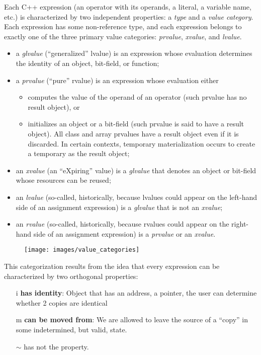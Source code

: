 Each C++ expression (an operator with its operands, a literal, a variable name, etc.) is characterized by two independent properties:
a \emph{type} and a \emph{value category}. Each expression has some non-reference type, and each expression belongs to exactly one of the three
primary value categories: \emph{prvalue}, \emph{xvalue}, and \emph{lvalue}.
\begin{itemize}
  \item a \emph{glvalue} (``generalized'' lvalue) is an expression whose evaluation determines the identity of an object, bit-field, or function;
  \item a \emph{prvalue} (``pure'' rvalue) is an expression whose evaluation either \begin{itemize}
      \item computes the value of the operand of an operator (such prvalue has no result object), or
      \item initializes an object or a bit-field (such prvalue is said to have a result object). All class and array prvalues have a result object
            even if it is discarded. In certain contexts, temporary materialization occurs to create a temporary as the result object;
  \end{itemize}
  \item an \emph{xvalue} (an ``eXpiring'' value) is a \emph{glvalue} that denotes an object or bit-field whose resources can be reused;
  \item an \emph{lvalue} (so-called, historically, because lvalues could appear on the left-hand side of an assignment expression) is a
        \emph{glvalue} that is not an \emph{xvalue};
  \item an \emph{rvalue} (so-called, historically, because rvalues could appear on the right-hand side of an assignment expression) is a
        \emph{prvalue} or an \emph{xvalue}.
\end{itemize}

\begin{figure}[ht]
\begin{center}
\texttt{[image: images/value\_categories]}
\end{center}
\end{figure}

This categorization results from the idea that every expression can be characterized by two orthogonal properties:
\begin{enumerate}
\item[i] \textbf{has identity}: Object that has an address, a pointer, the user can determine whether 2 copies are identical
\item[m] \textbf{can be moved from}: We are allowed to leave the source of a ``copy'' in some indetermined, but valid, state.
\item[$\sim$] has not the property.
\end{enumerate}


